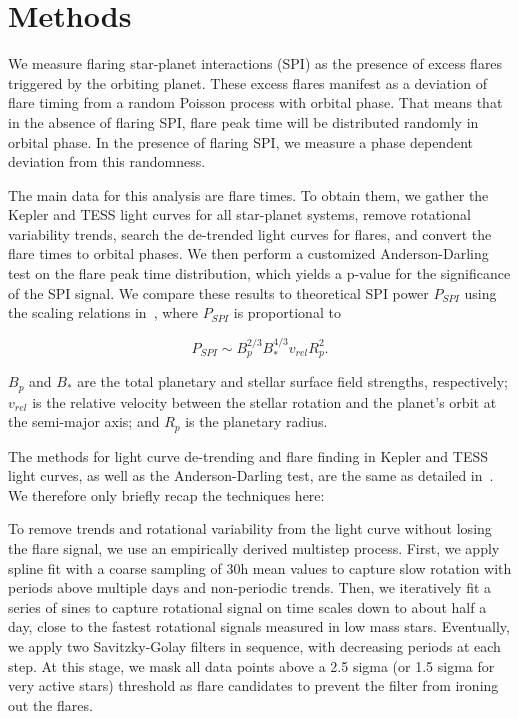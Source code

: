 \documentclass[twocolumn]{aastex631}
\begin{document}
\section{Methods}
\label{sec:methods}
We measure flaring star-planet interactions (SPI) as the presence of excess flares triggered by the orbiting planet. These excess flares manifest as a deviation of flare timing from a random Poisson process with orbital phase. That means that in the absence of flaring SPI, flare peak time will be distributed randomly in orbital phase. In the presence of flaring SPI, we measure a phase dependent deviation from this randomness.

The main data for this analysis are flare times. To obtain them, we gather the Kepler and TESS light curves for all star-planet systems, remove rotational variability trends, search the de-trended light curves for flares, and convert the flare times to orbital phases. We then perform a customized Anderson-Darling test on the flare peak time distribution, which yields a p-value for the significance of the SPI signal. We compare these results to theoretical SPI power $P_{SPI}$ using the scaling relations in~\cite{lanza2012starplanet}, where $P_{SPI}$ is proportional to

\begin{equation}
    P_{SPI} \sim B_p^{2/3} B_*^{4/3} v_{rel} R_p^2.
\end{equation}

$B_p$ and $B_*$ are the total planetary and stellar surface field strengths, respectively; $v_{rel}$ is the relative velocity between the stellar rotation and the planet's orbit at the semi-major axis; and $R_p$ is the planetary radius.


The methods for light curve de-trending and flare finding in Kepler and TESS light curves, as well as the Anderson-Darling test, are the same as detailed in~\citep{ilin2022searching}. We therefore only briefly recap the techniques here:

To remove trends and rotational variability from the light curve without losing the flare signal, we use an empirically derived multistep process. First, we apply spline fit with a coarse sampling of 30h mean values to capture slow rotation with periods above multiple days and non-periodic trends. Then, we iteratively fit a series of sines to capture rotational signal on time scales down to about half a day, close to the fastest rotational signals measured in low mass stars. Eventually, we apply two Savitzky-Golay filters in sequence, with decreasing periods at each step. At this stage, we mask all data points above a 2.5 sigma (or 1.5 sigma for very active stars) threshold as flare candidates to prevent the filter from ironing out the flares.
\end{document}
